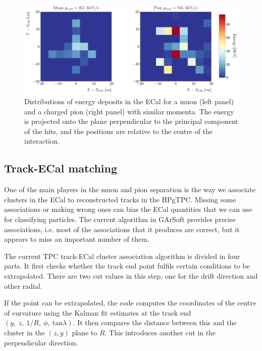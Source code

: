 \begin{figure}[t]
	\centering
	\includegraphics[width=.95\linewidth]{Images/GArSoft_PID/BDT/ecal_energy_distribution_example.pdf}
	\caption[Distributions of energy deposits in the ECal for a muon and a charged pion with similar momenta.]{Distributions of energy deposits in the ECal for a muon (left panel) and a charged pion (right panel) with similar momenta. The energy is projected onto the plane perpendicular to the principal component of the hits, and the positions are relative to the centre of the interaction.}
	\label{fig:ecal_example}
\end{figure}

\subsection{Track-ECal matching}

One of the main players in the muon and pion separation is the way we associate clusters in the ECal to reconstructed tracks in the HPgTPC. Missing some associations or making wrong ones can bias the ECal quantities that we can use for classifying particles. The current algorithm in GArSoft provides precise associations, i.e. most of the associations that it produces are correct, but it appears to miss an important number of them.

The current TPC track-ECal cluster association algorithm is divided in four parts. It first checks whether the track end point fulfils certain conditions to be extrapolated. There are two cut values in this step, one for the drift direction and other radial.

If the point can be extrapolated, the code computes the coordinates of the centre of curvature using the Kalman fit estimates at the track end $(y, \ z, \ 1/R, \ \phi, \ \mathrm{tan}\lambda)$. It then compares the distance between this and the cluster in the $(z,y)$ plane to $R$. This introduces another cut in the perpendicular direction.

